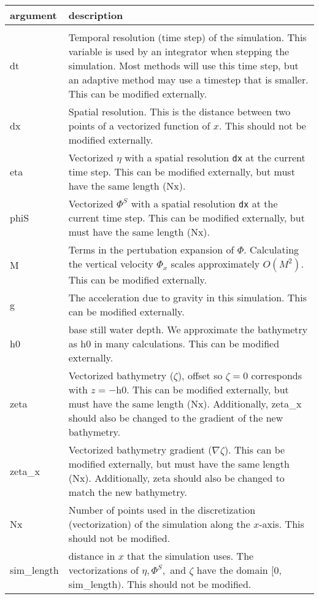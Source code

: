 \documentclass[10pt,a4paper]{article}
\newenvironment{arglist}
    {\begin{center}
    \begin{tabular}{l|p{12cm}}
    argument & description\\
    \hline\\
    }
    { 
    \end{tabular} 
    \end{center}
    }
\begin{document}
\begin{arglist}
dt & Temporal resolution (time step) of the simulation. This variable is used by an integrator when stepping the simulation. Most methods will use this time step, but an adaptive method may use a timestep that is smaller. This can be modified externally.\\\hline

dx & Spatial resolution. This is the distance between two points of a vectorized function of $x$. This should not be modified externally.\\\hline

eta & Vectorized $\eta$ with a spatial resolution \texttt{dx} at the current time step. This can be modified externally, but must have the same length (Nx).\\\hline

phiS & Vectorized $\Phi^S$ with a spatial resolution \texttt{dx} at the current time step. This can be modified externally, but must have the same length (Nx). \\\hline

M & Terms in the pertubation expansion of $\Phi$. Calculating the vertical velocity $\Phi_x$ scales approximately $O(M^2)$. This can be modified externally.\\\hline

g & The acceleration due to gravity in this simulation. This can be modified externally.\\\hline

h0 & base still water depth. We approximate the bathymetry as h0 in many calculations. This can be modified externally.\\\hline

zeta & Vectorized bathymetry ($\zeta$), offset so $\zeta = 0$ corresponds with $z = -$h0. This can be modified externally, but must have the same length (Nx). Additionally, zeta\_x should also be changed to the gradient of the new bathymetry.\\\hline

zeta\_x & Vectorized bathymetry gradient ($\nabla\zeta$). This can be modified externally, but must have the same length (Nx). Additionally, zeta should also be changed to match the new bathymetry.\\\hline

Nx & Number of points used in the discretization (vectorization) of the simulation along the $x$-axis. This should not be modified.\\\hline

sim\_length & distance in $x$ that the simulation uses. The vectorizations of $\eta,\Phi^S,$ and $\zeta$ have the domain $[0,$ sim\_length$)$. This should not be modified.\\\hline


\end{arglist}
\end{document}

